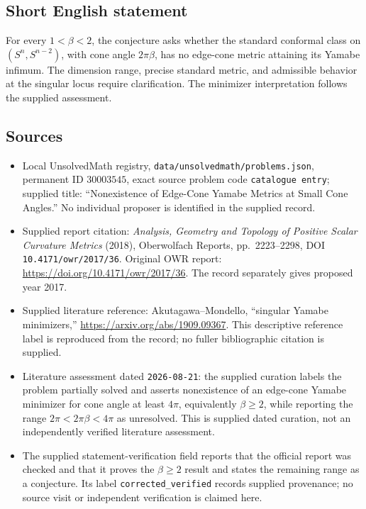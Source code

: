 \documentclass[11pt]{article}
\begin{document}
\subsection{Short English statement}
For every \(1<\beta<2\), the conjecture asks whether the standard conformal class on \((S^n,S^{n-2})\), with cone angle \(2\pi\beta\), has no edge-cone metric attaining its Yamabe infimum. The dimension range, precise standard metric, and admissible behavior at the singular locus require clarification. The minimizer interpretation follows the supplied assessment.
\subsection{Sources}
\begin{itemize}
\item Local UnsolvedMath registry, \texttt{data/unsolvedmath/problems.json}, permanent ID \(30003545\), exact source problem code \texttt{catalogue entry}; supplied title: ``Nonexistence of Edge-Cone Yamabe Metrics at Small Cone Angles.'' No individual proposer is identified in the supplied record.
\item Supplied report citation: \emph{Analysis, Geometry and Topology of Positive Scalar Curvature Metrics} (2018), Oberwolfach Reports, pp.\ 2223--2298, DOI \texttt{10.4171/owr/2017/36}. Original OWR report: \url{https://doi.org/10.4171/owr/2017/36}. The record separately gives proposed year 2017.
\item Supplied literature reference: Akutagawa--Mondello, ``singular Yamabe minimizers,'' \url{https://arxiv.org/abs/1909.09367}. This descriptive reference label is reproduced from the record; no fuller bibliographic citation is supplied.
\item Literature assessment dated \texttt{2026-08-21}: the supplied curation labels the problem partially solved and asserts nonexistence of an edge-cone Yamabe minimizer for cone angle at least \(4\pi\), equivalently \(\beta\geq2\), while reporting the range \(2\pi<2\pi\beta<4\pi\) as unresolved. This is supplied dated curation, not an independently verified literature assessment.
\item The supplied statement-verification field reports that the official report was checked and that it proves the \(\beta\geq2\) result and states the remaining range as a conjecture. Its label \texttt{corrected\_verified} records supplied provenance; no source visit or independent verification is claimed here.
\end{itemize}
\end{document}
